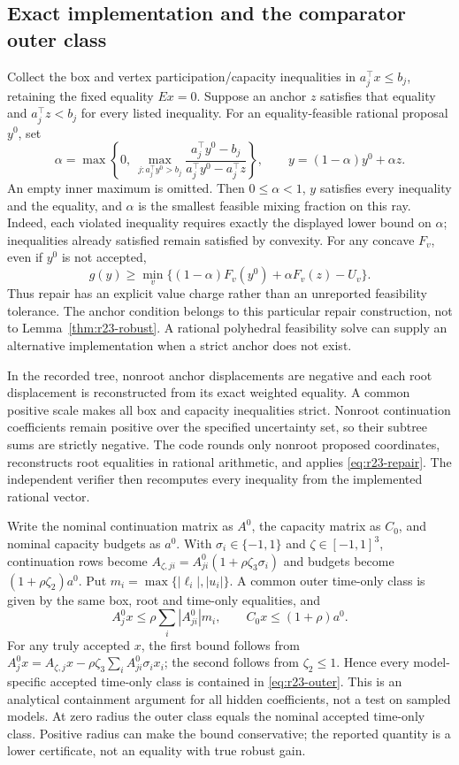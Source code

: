 \documentclass[11pt,letterpaper]{article}
\theoremstyle{definition}
\newcommand{\1}{\mathbf 1}
\begin{document}
\subsection{Exact implementation and the comparator outer class}
Collect the box and vertex participation/capacity inequalities in $a_j^\top x\leq b_j$, retaining the fixed equality $Ex=0$. Suppose an anchor $z$ satisfies that equality and $a_j^\top z<b_j$ for every listed inequality. For an equality-feasible rational proposal $y^0$, set
\begin{equation}\label{eq:r23-repair}
 \alpha=\max\left\{0,\ \max_{j:a_j^\top y^0>b_j}
 \frac{a_j^\top y^0-b_j}{a_j^\top y^0-a_j^\top z}\right\},\qquad
 y=(1-\alpha)y^0+\alpha z.
\end{equation}
An empty inner maximum is omitted. Then $0\leq\alpha<1$, $y$ satisfies every inequality and the equality, and $\alpha$ is the smallest feasible mixing fraction on this ray. Indeed, each violated inequality requires exactly the displayed lower bound on $\alpha$; inequalities already satisfied remain satisfied by convexity. For any concave $F_v$, even if $y^0$ is not accepted,
\[
 g(y)\geq\min_v\{(1-\alpha)F_v(y^0)+\alpha F_v(z)-U_v\}.
\]
Thus repair has an explicit value charge rather than an unreported feasibility tolerance. The anchor condition belongs to this particular repair construction, not to Lemma~\ref{thm:r23-robust}. A rational polyhedral feasibility solve can supply an alternative implementation when a strict anchor does not exist.

In the recorded tree, nonroot anchor displacements are negative and each root displacement is reconstructed from its exact weighted equality. A common positive scale makes all box and capacity inequalities strict. Nonroot continuation coefficients remain positive over the specified uncertainty set, so their subtree sums are strictly negative. The code rounds only nonroot proposed coordinates, reconstructs root equalities in rational arithmetic, and applies \eqref{eq:r23-repair}. The independent verifier then recomputes every inequality from the implemented rational vector.

Write the nominal continuation matrix as $A^0$, the capacity matrix as $C_0$, and nominal capacity budgets as $a^0$. With $\sigma_i\in\{-1,1\}$ and $\zeta\in[-1,1]^3$, continuation rows become $A_{\zeta,ji}=A^0_{ji}(1+\rho\zeta_3\sigma_i)$ and budgets become $(1+\rho\zeta_2)a^0$. Put $m_i=\max\{|\ell_i|,|u_i|\}$. A common outer time-only class is given by the same box, root and time-only equalities, and
\begin{equation}\label{eq:r23-outer}
 A^0_jx\leq\rho\sum_i|A^0_{ji}|m_i,\qquad
 C_0x\leq(1+\rho)a^0.
\end{equation}
For any truly accepted $x$, the first bound follows from
$A^0_jx=A_{\zeta,j}x-\rho\zeta_3\sum_iA^0_{ji}\sigma_ix_i$;
the second follows from $\zeta_2\leq1$. Hence every model-specific accepted time-only class is contained in \eqref{eq:r23-outer}. This is an analytical containment argument for all hidden coefficients, not a test on sampled models. At zero radius the outer class equals the nominal accepted time-only class. Positive radius can make the bound conservative; the reported quantity is a lower certificate, not an equality with true robust gain.
\end{document}

